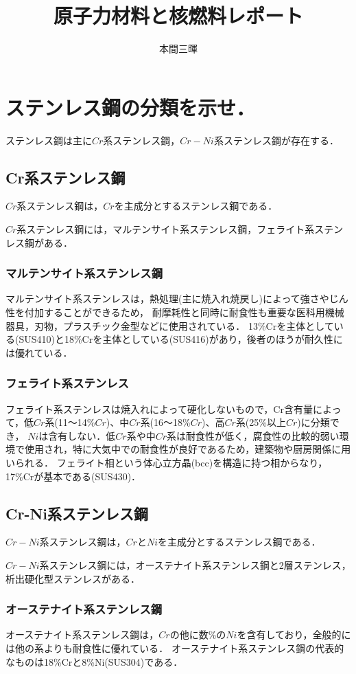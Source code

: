 \documentclass[titlepage,a4paper]{jsarticle}
\title{原子力材料と核燃料レポート}
\author{本間三暉}
\begin{document}
\maketitle
\section{ステンレス鋼の分類を示せ．}
ステンレス鋼は主に$Cr$系ステンレス鋼，$Cr-Ni$系ステンレス鋼が存在する．
\subsection{Cr系ステンレス鋼}
$Cr$系ステンレス鋼は，$Cr$を主成分とするステンレス鋼である．

$Cr$系ステンレス鋼には，マルテンサイト系ステンレス鋼，フェライト系ステンレス鋼がある．
\subsubsection{マルテンサイト系ステンレス鋼}
マルテンサイト系ステンレスは，熱処理(主に焼入れ焼戻し)によって強さやじん性を付加することができるため，
耐摩耗性と同時に耐食性も重要な医科用機械器具，刃物，プラスチック金型などに使用されている．
13\%Crを主体としている(SUS410)と18\%Crを主体としている(SUS416)があり，後者のほうが耐久性には優れている．
\subsubsection{フェライト系ステンレス}
フェライト系ステンレスは焼入れによって硬化しないもので，Cr含有量によって，低$Cr$系(11～14\%$Cr$)、中$Cr$系(16～18\%$Cr$)、高$Cr$系(25\%以上$Cr$)に分類でき，
$Ni$は含有しない．低$Cr$系や中$Cr$系は耐食性が低く，腐食性の比較的弱い環境で使用され，特に大気中での耐食性が良好であるため，建築物や厨房関係に用いられる．
フェライト相という体心立方晶(bcc)を構造に持つ相からなり，17\%Crが基本である(SUS430)．

\subsection{Cr-Ni系ステンレス鋼}
$Cr-Ni$系ステンレス鋼は，$Cr$と$Ni$を主成分とするステンレス鋼である．

$Cr-Ni$系ステンレス鋼には，オーステナイト系ステンレス鋼と2層ステンレス，析出硬化型ステンレスがある．
\subsubsection{オーステナイト系ステンレス鋼}
オーステナイト系ステンレス鋼は，$Cr$の他に数\%の$Ni$を含有しており，全般的には他の系よりも耐食性に優れている．
オーステナイト系ステンレス鋼の代表的なものは18\%Crと8\%Ni(SUS304)である．
\end{document}
